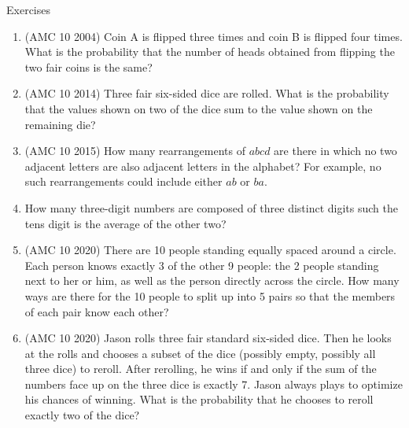 \begin{xcb}{Exercises}
\begin{enumerate}
\begin{hint}
\end{hint}
\item (AMC 10 2004)  Coin A is flipped three times and coin B is flipped four times. What is the probability that the number of heads obtained from flipping the two fair coins is the same?
\item (AMC 10 2014)  Three fair six-sided dice are rolled. What is the probability that the values shown on two of the dice sum to the value shown on the remaining die?
\item(AMC 10 2015)  How many rearrangements of $abcd$ are there in which no two adjacent letters are also adjacent letters in the alphabet? For example, no such rearrangements could include either $ab$ or $ba$.
\begin{hint}
\end{hint}
\item {} How many three-digit numbers are composed of three distinct digits such the tens digit is the average of the other two?
\begin{hint}
\end{hint}
\item (AMC 10 2020)  There are 10 people standing equally spaced around a circle. Each person knows exactly 3 of the other 9 people: the 2 people standing next to her or him, as well as the person directly across the circle. How many ways are there for the 10 people to split up into 5 pairs so that the members of each pair know each other?
\begin{hint}
\end{hint}
\item (AMC 10 2020)  Jason rolls three fair standard six-sided dice. Then he looks at the rolls and chooses a subset of the dice (possibly empty, possibly all three dice) to reroll. After rerolling, he wins if and only if the sum of the numbers face up on the three dice is exactly 7. Jason always plays to optimize his chances of winning. What is the probability that he chooses to reroll exactly two of the dice?
\begin{hint}

\end{hint}
\end{enumerate}
\end{xcb}
